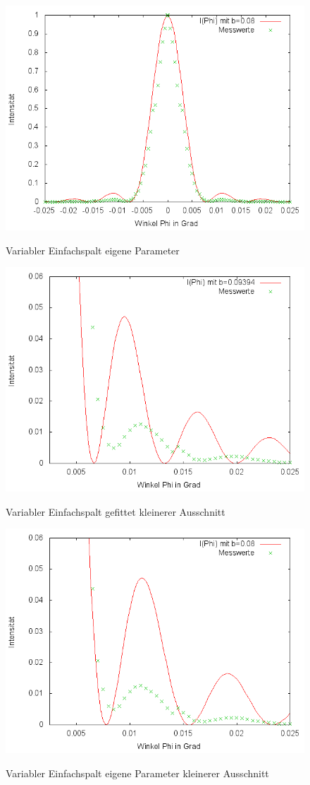 \begin{figure}[htbp]
\includegraphics[width=12cm]{pics/7.png}
\centering
\label{a6}
\caption{Variabler Einfachspalt eigene Parameter}
\end{figure}


\begin{figure}[htbp]
\includegraphics[width=12cm]{pics/6.png}
\centering
\label{a7}
\caption{Variabler Einfachspalt gefittet kleinerer Ausschnitt}
\end{figure}

\begin{figure}[htbp]
\includegraphics[width=12cm]{pics/8.png}
\centering
\label{a8}
\caption{Variabler Einfachspalt eigene Parameter kleinerer Ausschnitt}
\end{figure}


